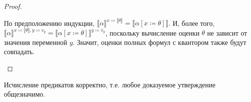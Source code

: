 \begin{proof}
\begin{itemize}
По предположению индукции, $\llbracket\alpha\rrbracket^{x \coloneqq  \llbracket\theta\rrbracket} = 
\llbracket\alpha[x\coloneqq \theta]\rrbracket$. И, более того,
$\llbracket\alpha\rrbracket^{x \coloneqq  \llbracket\theta\rrbracket, y \coloneqq  v_y} = \llbracket\alpha[x\coloneqq \theta]\rrbracket^{y \coloneqq  v_y}$,
поскольку вычисление оценки $\theta$ не зависит от значения переменной $y$.
Значит, оценки полных формул с квантором также будут совпадать.
\end{itemize}

\end{proof}

\begin{theorem}
Исчисление предикатов корректно, т.е. любое доказуемое утверждение общезначимо.
\end{theorem}


